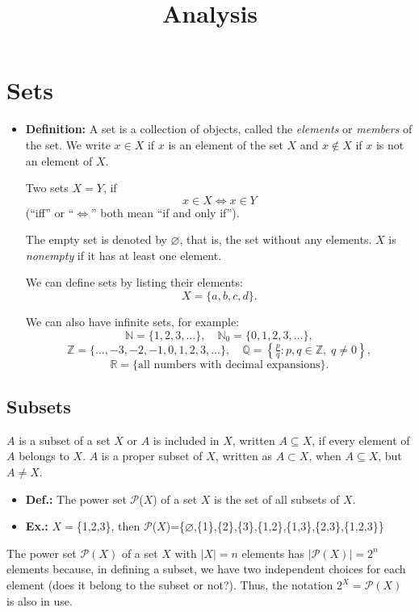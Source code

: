 \documentclass{article}
\begin{document}
\title{Analysis}
\date{}
\maketitle

\newpage
\tableofcontents

\newpage
\section{Sets}
\begin{itemize}
\item \textbf{Definition:} A set is a collection of objects, called the \emph{elements} or \emph{members} of the set.  
We write $x \in X$ if $x$ is an element of the set $X$ and $x \notin X$ if $x$ is not an element of $X$.

Two sets $X = Y$, if
\[
x \in X \iff x \in Y
\]
(``iff'' or ``$\Leftrightarrow$'' both mean ``if and only if'').

The empty set is denoted by $\varnothing$, that is, the set without any elements.  
$X$ is \emph{nonempty} if it has at least one element.

We can define sets by listing their elements:
\[
X = \{a, b, c, d\}.
\]

We can also have infinite sets, for example:
\[
\mathbb{N} = \{1, 2, 3, \dots\}, \quad
\mathbb{N}_0 = \{0, 1, 2, 3, \dots\},
\]
\[
\mathbb{Z} = \{\dots, -3, -2, -1, 0, 1, 2, 3, \dots\}, \quad
\mathbb{Q} = \left\{ \tfrac{p}{q} : p, q \in \mathbb{Z}, \; q \neq 0 \right\},
\]
\[
\mathbb{R} = \{\text{all numbers with decimal expansions}\}.
\]
\end{itemize}
\subsection{Subsets}

$A$ is a subset of a set $X$ or $A$ is included in $X$, written $A \subseteq X$, if every element of $A$ belongs to $X$. $A$ is a proper subset of $X$, written as $A \subset X$, when $A \subseteq X$, but $A \neq X$.

\begin{itemize}
\item\textbf{Def.:} The power set $\mathcal{P}$($X$) of a set $X$ is the set of all subsets of $X$.

\item\textbf{Ex.:} $X=$\{1,2,3\}, then $\mathcal{P}$($X$)=\{$\varnothing$,\{1\},\{2\},\{3\},\{1,2\},\{1,3\},\{2,3\},\{1,2,3\}\}
\end{itemize}
The power set $\mathcal{P}(X)$ of a set $X$ with $|X|=n$ elements has $|\mathcal{P}(X)|=2^n$ elements because, in defining a subset, we have two independent choices for each element (does it belong to the subset or not?). Thus, the notation $2^X=\mathcal{P}(X)$ is also in use.
\end{document}
